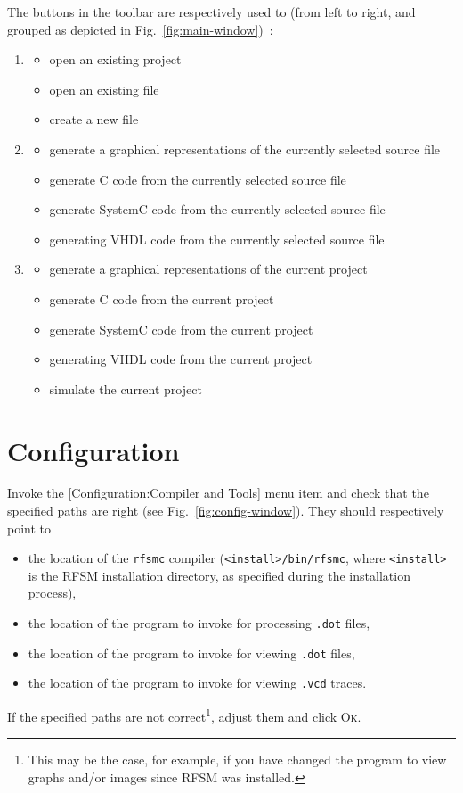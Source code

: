 The buttons in the toolbar are respectively used to (from left to right, and grouped as depicted in
Fig.~\ref{fig:main-window})~:
\begin{enumerate}
\item 
  \begin{itemize}
  \item open an existing project
  \item open an existing file
  \item create a new file
  \end{itemize}
\item 
  \begin{itemize}
  \item generate a graphical representations of the currently selected source file
  \item generate C code from the currently selected source file
  \item generate SystemC code from the currently selected source file
  \item generating VHDL code from the  currently selected source file
  \end{itemize}
\item 
  \begin{itemize}
  \item generate a graphical representations of the current project
  \item generate C code from the current project
  \item generate SystemC code from the current project
  \item generating VHDL code from the current project
  \item simulate the current project
  \end{itemize}
\end{enumerate}

\section{Configuration}
\label{sec:gui-configuration}

Invoke the [\textsf{Configuration:Compiler and Tools}] menu item and check that the specified paths
are right (see Fig.~\ref{fig:config-window}). They should respectively point to 
\begin{itemize}
\item the location of the \texttt{rfsmc} compiler (\verb|<install>/bin/rfsmc|, where
  \verb|<install>| is the RFSM installation directory, as specified during the installation
  process),
\item the location of the program to invoke for processing \verb|.dot| files, 
\item the location of the program to invoke for viewing \verb|.dot| files, 
\item the location of the program to invoke for viewing \verb|.vcd| traces. 
\end{itemize}
If the specified paths are not correct\footnote{This may be the case, for example, if you have
  changed the program to view graphs and/or images since RFSM was installed.}, adjust them and click \textsc{Ok}.


